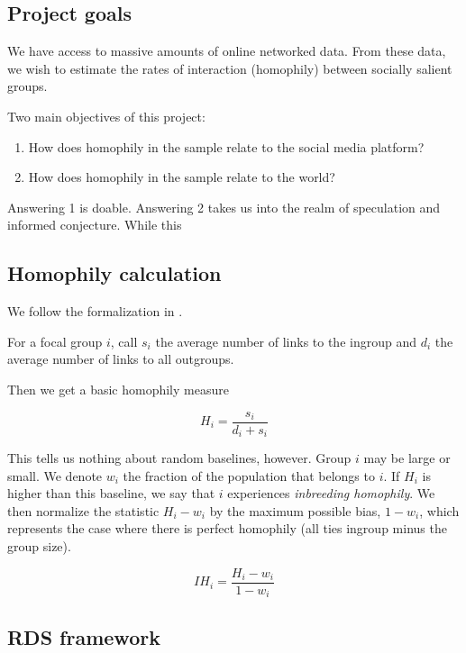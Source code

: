\documentclass[a4paper]{article}
\begin{document}
\subsection{Project goals}

We have access to massive amounts of online networked data. From these data, we wish to estimate the rates of interaction (homophily) between socially salient groups.

Two main objectives of this project:

\begin{enumerate}
\item How does homophily in the sample relate to the social media platform?
\item How does homophily in the sample relate to the world?
\end{enumerate}

Answering 1 is doable. Answering 2 takes us into the realm of speculation and informed conjecture. While this

\subsection{Homophily calculation}

We follow the formalization in \cite{currarini_economic_2009}.

For a focal group $i$, call $s_i$ the average number of links to the ingroup and $d_i$ the average number of links to all outgroups.

Then we get a basic homophily measure

\begin{equation}
H_i = \frac{s_i}{d_i + s_i}
\end{equation}

This tells us nothing about random baselines, however. Group $i$ may be large or small. We denote $w_i$ the fraction of the population that belongs to $i$. If $H_i$ is higher than this baseline, we say that $i$ experiences \emph{inbreeding homophily}. We then normalize the statistic $H_i - w_i$ by the maximum possible bias, $1 - w_i$, which represents the case where there is perfect homophily (all ties ingroup minus the group size).

\begin{equation}
IH_i = \frac{H_i - w_i}{1 - w_i}
\end{equation}

\subsection{RDS framework}
\end{document}

